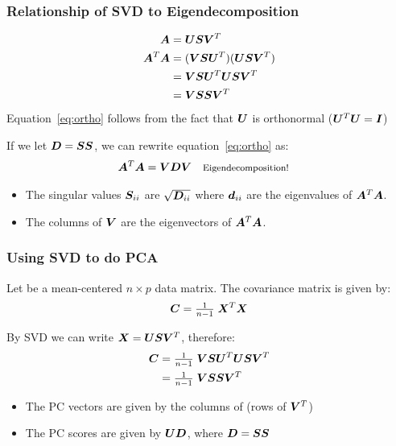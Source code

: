 \documentclass{beamer}
\begin{document}
\begin{frame}[fragile]
  \frametitle{Relationship of SVD to Eigendecomposition}

\begin{align}
  \bm{A} &= \bm{U} \bm{S} \bm{V}^T \\
  \bm{A}^ T\bm{A} &= (\bm{V}\bm{S}\bm{U}^T)(\bm{U} \bm{S} \bm{V}^T)\\
      &= \bm{V} \bm{S} \bm{U}^T \bm{U} \bm{S} \bm{V}^T \\
      &= \bm{V}\bm{S}\bm{S}\bm{V}^T  \label{eq:ortho}
\end{align}
Equation~\ref{eq:ortho} follows from the fact that $\bm{U}$ is orthonormal ($\bm{U}^T \bm{U} = \bm{I}$)

\smallskip
If we let $\bm{D} = \bm{S}\bm{S}$, we can rewrite equation~\ref{eq:ortho} as:
\begin{align}
  \bm{A}^ T\bm{A} &= \bm{V}\bm{D}\bm{V} && \text{\footnotesize Eigendecomposition!}
\end{align}

\begin{itemize}
\item The singular values $\bm{S}_{ii}$ are $\sqrt{\bm{D}_{ii}}$ where $\bm{d}_{ii}$ are the eigenvalues of $\bm{A}^ T\bm{A}$.

\item The columns of $\bm{V}$ are the eigenvectors of $\bm{A}^ T\bm{A}$.
\end{itemize}

\end{frame}


\begin{frame}[fragile]
  \frametitle{Using SVD to do PCA}

Let  be a mean-centered $n \times p$ data matrix. The covariance matrix is given by:
\begin{align*}
  \bm{C} = \tfrac{1}{n-1} \; \bm{X}^T \bm{X}
\end{align*}

By SVD we can write $\bm{X} = \bm{U}\bm{S}\bm{V}^T$, therefore:
\begin{align*}
  \bm{C} &= \tfrac{1}{n-1} \; \bm{V}\bm{S}\bm{U}^T \bm{U}\bm{S}\bm{V}^T \\
          &= \tfrac{1}{n-1} \; \bm{V} \bm{S}\bm{S} \bm{V}^T
\end{align*}

\begin{itemize}
  \item The PC vectors are given by the columns of  (rows of $\bm{V}^T$)
  \item The PC scores are given by $\bm{U}\bm{D}$, where $\bm{D} = \bm{S}\bm{S}$
\end{itemize}

\end{frame}
\end{document}
